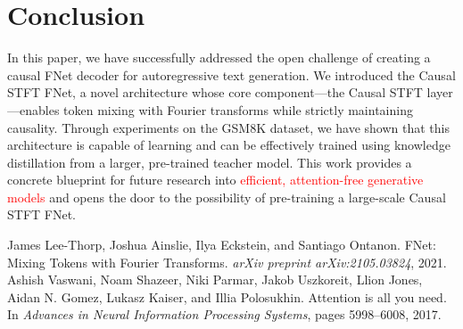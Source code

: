 \documentclass[11pt,a4paper]{article}
\begin{document}
\section{Conclusion}
In this paper, we have successfully addressed the open challenge of creating a causal FNet decoder for autoregressive text generation. We introduced the Causal STFT FNet, a novel architecture whose core component—the Causal STFT layer—enables token mixing with Fourier transforms while strictly maintaining causality. Through experiments on the GSM8K dataset, we have shown that this architecture is capable of learning and can be effectively trained using knowledge distillation from a larger, pre-trained teacher model. This work provides a concrete blueprint for future research into \textcolor{red}{efficient, attention-free generative models} and opens the door to the possibility of pre-training a large-scale Causal STFT FNet.

\begin{thebibliography}{99}
James Lee-Thorp, Joshua Ainslie, Ilya Eckstein, and Santiago Ontanon.
\newblock FNet: Mixing Tokens with Fourier Transforms.
\newblock \emph{arXiv preprint arXiv:2105.03824}, 2021.
Ashish Vaswani, Noam Shazeer, Niki Parmar, Jakob Uszkoreit, Llion Jones, Aidan N. Gomez, Lukasz Kaiser, and Illia Polosukhin.
\newblock Attention is all you need.
\newblock In \emph{Advances in Neural Information Processing Systems}, pages 5998--6008, 2017.
\end{thebibliography}
\end{document}

